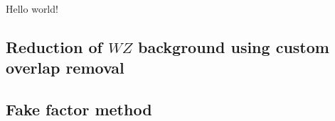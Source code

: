 Hello world!

\subsection{Reduction of $WZ$ background using custom overlap removal}\label{ssww13tev:custom_or}


\subsection{Fake factor method}\label{ssww13tev:fake_factor}

